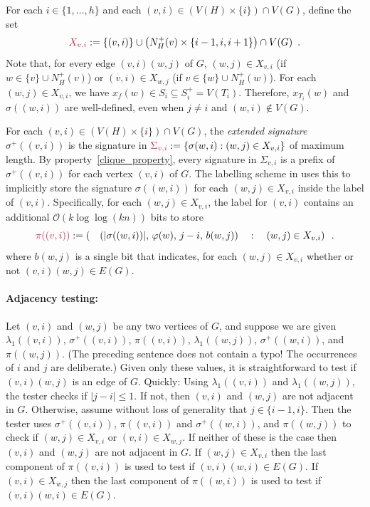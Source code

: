 \documentclass{patmorin}
\makeatletter
\renewcommand{\le}{\leqslant}
\newcommand{\defin}[1]{\emph{\textcolor{brightmaroon}{#1}}}
\def\mathcolor#1#{\@mathcolor{#1}}
\def\@mathcolor#1#2#3{%
  \protect\leavevmode
  \begingroup
    \color#1{#2}#3%
  \endgroup
}
\newcommand{\mathdefin}[1]{\mathcolor{brightmaroon}{#1}}
\newcommand{\Oh}{\calO}
\newcommand{\calO}{\mathcal{O}}
\makeatother
\begin{document}
  For each $i\in\{1,\ldots,h\}$ and each $(v,i)\in (V(H)\times\{i\})\cap V(G)$, define the set
  \[
     \mathdefin{X_{v,i}}:= \{(v,i)\}\cup \left(N_H^+(v)\times\{i-1,i,i+1\}\right)\cap V(G) \enspace .
  \]
  Note that, for every edge $(v,i)(w,j)$ of $G$, $(w,j)\in X_{v,i}$ (if $w\in \{v\}\cup N^+_H(v)$) or $(v,i)\in X_{w,j}$ (if $v\in \{w\}\cup N^+_H(w)$).
  For each $(w,j)\in X_{v,i}$, we have $x_f(w)\in S_i\subseteq S^+_i=V(T_i)$. Therefore, $x_{T_i}(w)$ and $\sigma((w,i))$ are well-defined, even when $j\neq i$ and $(w,i)\not\in V(G)$.

  For each $(v,i)\in (V(H)\times\{i\})\cap V(G)$, the \defin{extended signature} \defin{$\sigma^+((v,i))$} is the signature in $\mathdefin{\Sigma_{v,i}}:=\{\sigma(w,i):(w,j)\in X_{v,i}\}$ of maximum length.
  By property~\ref{clique_property}, every signature in $\Sigma_{v,i}$ is a prefix of $\sigma^+((v,i))$ for each vertex $(v,i)$ of $G$.
  The labelling scheme in \cite{dujmovic.esperet.ea:adjacency} uses this to implicitly store the signature $\sigma((w,i))$ for each $(w,j)\in X_{v,i}$ inside the label of $(v,i)$.
  Specifically, for each $(w,j)\in X_{v,i}$, the label for $(v,i)$ contains an additional $\Oh(k\log\log (kn))$ bits to store
  \begin{equation}
     \mathdefin{\pi((v,i))}:= \left( \quad(|\sigma((w,i))|,\, \varphi(w),\, j-i,\, b(w,j))\quad :\quad (w,j)\in X_{v,i}\right) \enspace .
     \label{four_tuple}
  \end{equation}
  where $b(w,j)$ is a single bit that indicates, for each $(w,j)\in X_{v,i}$ whether or not $(v,i)(w,j)\in E(G)$.

  \paragraph{Adjacency testing:}
  Let $(v,i)$ and $(w,j)$ be any two vertices of $G$, and suppose we are given $\lambda_1((v,i))$, $\sigma^+((v,i))$, $\pi((v,i))$, $\lambda_1((w,j))$, $\sigma^+((w,i))$, and $\pi((w,j))$.
  (The preceding sentence does not contain a typo! The occurrences of $i$ and $j$ are deliberate.) Given only these values, it is straightforward to test if $(v,i)(w,j)$ is an edge of $G$.
  Quickly: Using $\lambda_1((v,i))$ and $\lambda_1((w,j))$, the tester checks if $|j-i|\le 1$.
  If not, then $(v,i)$ and $(w,j)$ are not adjacent in $G$.  Otherwise, assume without loss of generality that $j\in\{i-1, i\}$.
  Then the tester uses $\sigma^+((v,i))$, $\pi((v,i))$ and $\sigma^+((w,i))$, and $\pi((w,j))$ to check if $(w,j)\in X_{v,i}$ or $(v,i)\in X_{w,j}$.
  If neither of these is the case then $(v,i)$ and $(w,j)$ are not adjacent in $G$.
  If $(w,j)\in X_{v,i}$ then the last component of $\pi((v,i))$ is used to test if $(v,i)(w,i)\in E(G)$.
  If $(v,i)\in X_{w,j}$ then the last component of $\pi((w,i))$ is used to test if $(v,i)(w,i)\in E(G)$.
\end{document}

